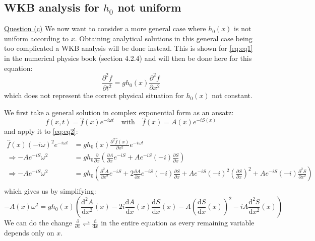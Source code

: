 \subsection{WKB analysis for $h_0$ not uniform}
\underline{Question (c)}
We now want to consider a more general case where $h_0(x)$ is not uniform according to $x$. Obtaining analytical solutions in this general case being too complicated a WKB analysis will be done instead. This is shown for \autoref{eq:eq1} in the numerical physics book \cite{physnumbook} (section 4.2.4) and will then be done here for this equation:
\begin{equation}
    \frac{\partial^2 f}{\partial t^2} = g h_0(x) \frac{\partial^2 f}{\partial x^2}
    \label{eq:eq2}
\end{equation}
which does not represent the correct physical situation for $h_0(x)$ not constant.

We first take a general solution in complex exponential form as an ansatz:
\begin{equation}
    f(x,t) = \hat{f}(x)e^{-i\omega t} \quad \mathrm{with} \quad
    \hat{f}(x) = A(x)e^{-iS(x)}
    \label{eq:ansatz}
\end{equation}
and apply it to \autoref{eq:eq2}:
\[
    \begin{aligned}
        \hat{f}(x)(-i\omega)^2e^{-i\omega t} &= gh_0(x)\frac{\partial^2 \hat{f}(x)}{\partial x^2} e^{-i\omega t} \\
        \Rightarrow -Ae^{-iS}\omega^2 &= gh_0 \frac{\partial}{\partial x}\left(\frac{\partial A}{\partial x}e^{-iS} + Ae^{-iS}(-i)\frac{\partial S}{\partial x}\right) \\
        \Rightarrow -Ae^{-iS}\omega^2 &= gh_0 \left(\frac{\partial^2 A}{\partial x^2}e^{-iS} + 2 \frac{\partial A}{\partial x}e^{-iS}(-i)\frac{\partial S}{\partial x} + Ae^{-iS}(-i)^2\left(\frac{\partial S}{\partial x}\right)^2 + Ae^{-iS}(-i)\frac{\partial^2 S}{\partial x^2} \right) \\
    \end{aligned}    
\]
which gives us by simplifying:
\begin{equation}
    -A(x)\omega^2 = gh_0(x)\left(\frac{\mathrm{d}^2 A}{\mathrm{d} x^2}(x) - 2i \frac{\mathrm{d} A}{\mathrm{d} x}(x)\frac{\mathrm{d} S}{\mathrm{d} x}(x) - A\left(\frac{\mathrm{d} S}{\mathrm{d} x}(x)\right)^2 - iA\frac{\mathrm{d}^2 S}{\mathrm{d} x^2}(x)\right)
    \label{eq:equation_exponential_wkb}
\end{equation}
We can do the change $\frac{\partial}{\partial x} \rightleftharpoons \frac{\mathrm{d}}{\mathrm{d}x}$ in the entire equation as every remaining variable depends only on $x$.

